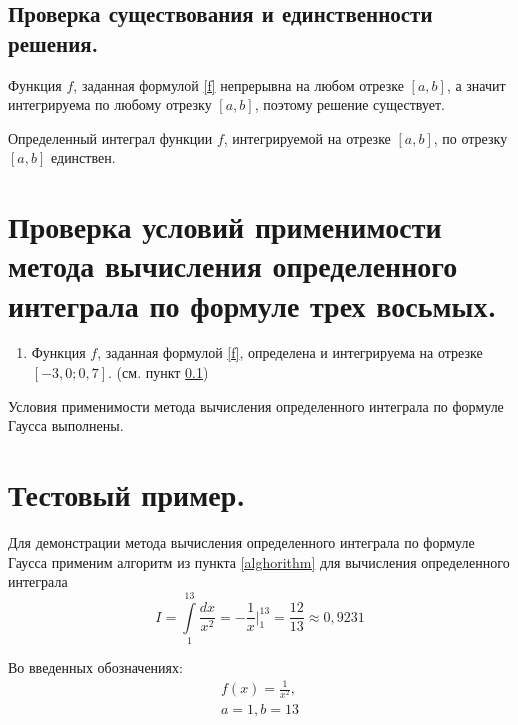 \documentclass[a4paper, 12pt]{article}
\begin{document}
	\subsection{Проверка существования и единственности решения.}
	\label{solexistance}
	
	Функция $f$, заданная формулой \eqref{f} непрерывна на любом отрезке $[a,b]$, а значит интегрируема по любому отрезку $[a,b]$, поэтому решение существует.
	
	Определенный интеграл функции $f$, интегрируемой на отрезке $[a,b]$, по отрезку $[a,b]$ единствен.
	
	\section{Проверка условий применимости метода вычисления определенного интеграла по формуле трех восьмых.}
	
	\begin{enumerate}
		\item Функция $f$, заданная формулой \eqref{f}, определена и интегрируема на отрезке $[-3,0;0,7]$. (см. пункт \ref{solexistance})
	\end{enumerate}
	
	Условия применимости метода вычисления определенного интеграла по формуле Гаусса выполнены.
	
	\section{Тестовый пример.}
	
	Для демонстрации метода вычисления определенного интеграла по формуле Гаусса применим алгоритм из пункта \ref{alghorithm} для вычисления определенного интеграла
	\begin{equation}
		I=\int\limits_1^{13}\frac{dx}{x^2}=-\frac{1}{x}\bigg|_1^{13}=\frac{12}{13}\approx0,9231
	\end{equation}

	Во введенных обозначениях:
	\begin{equation*}
		\begin{gathered}
		f(x)=\frac{1}{x^2},\\
		a=1, b=13
		\end{gathered}
	\end{equation*}
	
\end{document}
